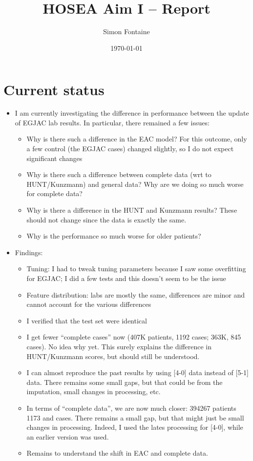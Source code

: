 \documentclass[12pt]{article}
\title{HOSEA Aim I -- Report}
\author{Simon Fontaine}
\date{\today}
\begin{document}
\maketitle




\section*{Current status}


\begin{itemize}
\item I am currently investigating the difference in performance between the update of EGJAC lab results. 
In particular, there remained a few issues:
\begin{itemize}
	\item Why is there such a difference in the EAC model? For this outcome, only a few control 
	(the EGJAC cases) changed slightly, so I do not expect significant changes
	\item Why is there such a difference between complete data (wrt to HUNT/Kunzmann) and general data? 
	Why are we doing so much worse for complete data? 
	\item Why is there a difference in the HUNT and Kunzmann results? These should not change since the data is exactly the same.
	\item Why is the performance so much worse for older patients? 
\end{itemize}
\item Findings:
\begin{itemize}
	\item Tuning: I had to tweak tuning parameters because I saw some overfitting for EGJAC; I did a few tests and this doesn't seem to be the issue
	\item Feature distribution: labs are mostly the same, differences are minor and cannot account for the various differences
	\item I verified that the test set were identical
	\item I get fewer ``complete cases'' now (407K patients, 1192 cases; 363K, 845 cases). No idea why yet. 
	This surely explains the difference in HUNT/Kunzmann scores, but should still be understood. 
	\item I can almost reproduce the past results by using [4-0] data instead of [5-1] data. There remains some small gaps, but that could be from
	the imputation, small changes in processing, etc.
	\item In terms of ``complete data'', we are now much closer: 394267 patients 1173 and cases. There remains a small gap, but that might just be small changes in processing. 
	Indeed, I used the lates processing for [4-0], while an earlier version was used.
	\item Remains to understand the shift in EAC and complete data.
\end{itemize}
\end{itemize}
\end{document}
